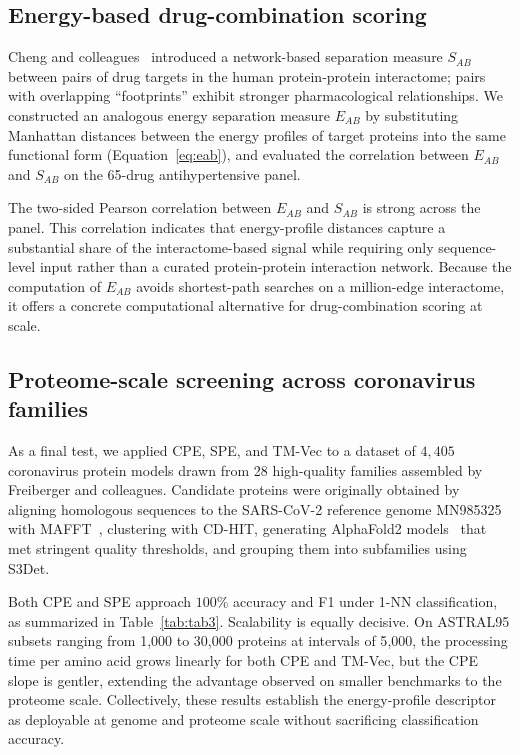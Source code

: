\documentclass[11pt]{article}
\begin{document}
\subsection{Energy-based drug-combination scoring}

Cheng and colleagues~\citep{zhou2020network} introduced a
network-based separation measure $S_{AB}$ between pairs of drug targets in
the human protein-protein interactome; pairs with overlapping
``footprints'' exhibit stronger pharmacological relationships. We
constructed an analogous energy separation measure $E_{AB}$ by substituting
Manhattan distances between the energy profiles of target proteins into
the same functional form (Equation~\ref{eq:eab}), and evaluated the
correlation between $E_{AB}$ and $S_{AB}$ on the 65-drug antihypertensive
panel.

The two-sided Pearson correlation between $E_{AB}$ and $S_{AB}$ is strong
across the panel. This correlation indicates that energy-profile
distances capture a substantial share of the interactome-based signal
while requiring only sequence-level input rather than a curated
protein-protein interaction network. Because the computation of $E_{AB}$
avoids shortest-path searches on a million-edge interactome, it offers a
concrete computational alternative for drug-combination scoring at scale.

\subsection{Proteome-scale screening across coronavirus families}

As a final test, we applied CPE, SPE, and TM-Vec to a dataset of $4{,}405$
coronavirus protein models drawn from 28 high-quality families assembled
by Freiberger and colleagues. Candidate proteins were originally obtained
by aligning homologous sequences to the SARS-CoV-2 reference genome
MN985325 with MAFFT~\citep{rozewicki2021mafft}, clustering with CD-HIT,
generating AlphaFold2 models~\citep{jumper2021alphafold} that met stringent
quality thresholds, and grouping them into subfamilies using S3Det.

Both CPE and SPE approach $100\%$ accuracy and F1 under 1-NN
classification, as summarized in Table~\ref{tab:tab3}. Scalability is
equally decisive. On ASTRAL95 subsets ranging from 1{,}000 to 30{,}000
proteins at intervals of 5{,}000, the processing time per amino acid grows
linearly for both CPE and TM-Vec, but the CPE slope is gentler, extending
the advantage observed on smaller benchmarks to the proteome scale.
Collectively, these results establish the energy-profile descriptor as
deployable at genome and proteome scale without sacrificing classification
accuracy.
\end{document}
